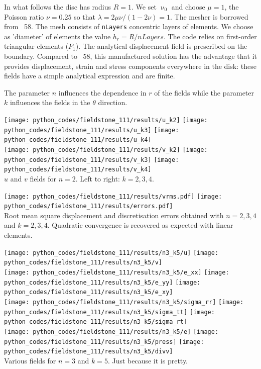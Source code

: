 In what follows the disc has radius $R=1$. 
We set $\upnu_0$ and choose $\mu=1$, the Poisson ratio $\nu=0.25$ so that 
$\lambda=2\mu\nu/(1-2\nu)=1$.
The mesher is borrowed from \stone~58. The mesh consists of {\tt nLayers} concentric layers of elements.
We choose as 'diameter' of elements the value $h_r=R/nLayers$.
The code relies on first-order triangular elements ($P_1$).
The analytical displacement field is prescribed on the boundary.
Compared to \stone~58, this manufactured solution has the advantage that 
it provides displacement, strain and stress components everywhere in the disk:
these fields have a simple analytical expression and are finite.

The parameter $n$ influences the dependence in $r$ of the fields 
while the parameter $k$ influences the fields in the $\theta$ direction.

\newpage

\begin{center}
\texttt{[image: python\_codes/fieldstone\_111/results/u\_k2]}
\texttt{[image: python\_codes/fieldstone\_111/results/u\_k3]}
\texttt{[image: python\_codes/fieldstone\_111/results/u\_k4]}\\
\texttt{[image: python\_codes/fieldstone\_111/results/v\_k2]}
\texttt{[image: python\_codes/fieldstone\_111/results/v\_k3]}
\texttt{[image: python\_codes/fieldstone\_111/results/v\_k4]}\\
{\captionfont $u$ and $v$ fields for $n=2$. Left to right: $k=2,3,4$.}
\end{center}

\begin{center}
\texttt{[image: python\_codes/fieldstone\_111/results/vrms.pdf]}
\texttt{[image: python\_codes/fieldstone\_111/results/errors.pdf]}\\
{\captionfont Root mean square displacement and discretisation 
errors obtained with $n=2,3,4$ and $k=2,3,4$. Quadratic convergence 
is recovered as expected with linear elements.}
\end{center}

\newpage

\begin{center}
\texttt{[image: python\_codes/fieldstone\_111/results/n3\_k5/u]}
\texttt{[image: python\_codes/fieldstone\_111/results/n3\_k5/v]}\\
\texttt{[image: python\_codes/fieldstone\_111/results/n3\_k5/e\_xx]}
\texttt{[image: python\_codes/fieldstone\_111/results/n3\_k5/e\_yy]}
\texttt{[image: python\_codes/fieldstone\_111/results/n3\_k5/e\_xy]}\\
\texttt{[image: python\_codes/fieldstone\_111/results/n3\_k5/sigma\_rr]}
\texttt{[image: python\_codes/fieldstone\_111/results/n3\_k5/sigma\_tt]}
\texttt{[image: python\_codes/fieldstone\_111/results/n3\_k5/sigma\_rt]}\\
\texttt{[image: python\_codes/fieldstone\_111/results/n3\_k5/e]}
\texttt{[image: python\_codes/fieldstone\_111/results/n3\_k5/press]}
\texttt{[image: python\_codes/fieldstone\_111/results/n3\_k5/divv]}\\
{\captionfont Various fields for $n=3$ and $k=5$. Just because it is pretty.}
\end{center}


